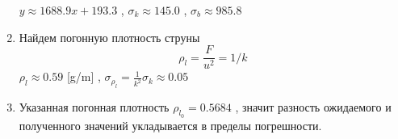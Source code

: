 \documentclass[8pt]{article}
\begin{document}
\begin{enumerate}
\begin{center}
    \end{center}
    $y \approx 1688.9 x + 193.3$ , $\sigma_k \approx 145.0$ , $\sigma_b \approx 985.8$
    \item Найдем погонную плотность струны
    \begin{equation}
        \rho_l = \frac{F}{u^2} = 1 / k
    \end{equation}
    $\rho_l \approx 0.59$ [g/m] , 
    $\sigma_{\rho_l} = \frac{1}{k^2} \sigma_k \approx 0.05$ \\
    \item
       Указанная погонная плотность $\rho_{l_0} = 0.5684$ , значит разность ожидаемого и полученного значений укладывается в пределы погрешности.
\end{enumerate}
\end{document}
